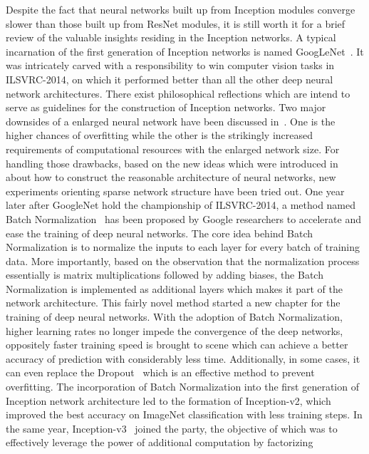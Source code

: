 Despite the fact that neural networks built up from Inception modules
converge slower than those built up from ResNet modules, it is still
worth it for a brief review of the valuable insights residing in
the Inception networks.
A typical incarnation of the first generation of Inception networks is named
GoogLeNet~\parencite{RN60}.
It was intricately carved with a responsibility to win computer vision
tasks in ILSVRC-2014, on which it performed better than all the other
deep neural network architectures.
There exist philosophical reflections which are intend to serve as guidelines
for the construction of Inception networks.
Two major downsides of a enlarged neural network have been discussed
in~\parencite{RN60}.
One is the higher chances of overfitting while the other is
the strikingly increased requirements of computational resources with the
enlarged network size.
For handling those drawbacks, based on the new ideas which were introduced
in~\parencite{RN207} about how to construct the reasonable architecture of
neural networks, new experiments orienting sparse network structure have
been tried out.
One year later after GoogleNet hold the championship of ILSVRC-2014,
a method named Batch Normalization~\parencite{RN61} has been
proposed by Google researchers to accelerate and ease the
training of deep neural networks.
The core idea behind Batch Normalization is to normalize
the inputs to each layer for every batch of training data.
More importantly, based on the observation that the normalization process
essentially is matrix multiplications followed by adding biases, the Batch
Normalization is implemented as additional layers which makes it part of
the network architecture.
This fairly novel method started a new chapter for the training of deep
neural networks.
With the adoption of Batch Normalization, higher learning rates no longer
impede the convergence of the deep networks, oppositely faster
training speed is brought to scene which can achieve a
better accuracy of prediction with considerably less time.
Additionally, in some cases, it can even replace the Dropout~\parencite{RN70}
which is an effective method to prevent overfitting.
The incorporation of Batch Normalization into the first generation of
Inception network architecture led to the formation of Inception-v2, which
improved the best accuracy on ImageNet classification with less training steps.
In the same year, Inception-v3~\parencite{RN62} joined the party, the objective of which was
to effectively leverage the power of additional computation by factorizing
